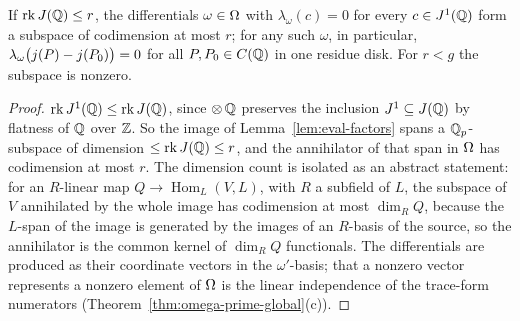 \begin{theorem}
\label{thm:annihilator}
\leanok
{}
If $\operatorname{rk}J(\mathbb{Q}) \le r$, the differentials $\omega \in \Omega$ with
$\lambda_\omega(c) = 0$ for every $c \in J^1(\mathbb{Q})$ form a subspace of codimension at most
$r$; for any such $\omega$, in particular,
$\lambda_\omega\big(j(P) - j(P_0)\big) = 0$ for all $P, P_0 \in C(\mathbb{Q})$ in one
residue disk. For $r < g$ the subspace is nonzero.
\end{theorem}
\begin{proof}
\leanok
$\operatorname{rk} J^1(\mathbb{Q}) \le \operatorname{rk}J(\mathbb{Q})$, since $\otimes\,\mathbb{Q}$
preserves the inclusion $J^1 \subseteq J(\mathbb{Q})$ by flatness of $\mathbb{Q}$ over $\mathbb{Z}$. So the
image of Lemma~\ref{lem:eval-factors} spans a $\mathbb{Q}_p$-subspace of dimension
$\le \operatorname{rk}J(\mathbb{Q}) \le r$, and the annihilator of that span in $\Omega$ has
codimension at most $r$. The dimension count is isolated as an abstract statement: for an
$R$-linear map $Q \to \operatorname{Hom}_L(V, L)$, with $R$ a subfield of $L$, the
subspace of $V$ annihilated by the whole image has codimension at most $\dim_R Q$,
because the $L$-span of the image is generated by the images of an $R$-basis of the
source, so the annihilator is the common kernel of $\dim_R Q$ functionals. The
differentials are produced as their coordinate vectors in the $\omega'$-basis; that a
nonzero vector represents a nonzero element of $\Omega$ is the linear independence of
the trace-form numerators (Theorem~\ref{thm:omega-prime-global}(c)).
\end{proof}

